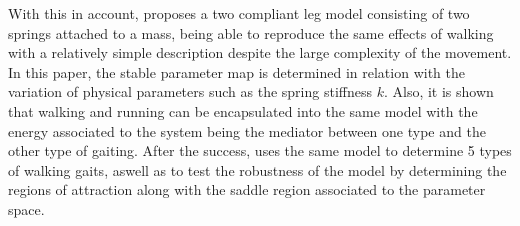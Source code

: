 With this in account, \cite{Seyfarth2006} proposes a two compliant leg model consisting of two springs attached to a mass, being able to reproduce the same effects of walking with a relatively simple description despite the large complexity of the movement. In this paper, the stable parameter map is determined in relation with the variation of physical parameters such as the spring stiffness $k$. Also, it is shown that walking and running can be encapsulated into the same model with the energy associated to the system being the mediator between one type and the other type of gaiting.  After the success, \cite{Rummel2010} uses the same model to determine 5 types of walking gaits, aswell as to test the robustness of the model by determining the regions of attraction along with the saddle region associated to the parameter space.






